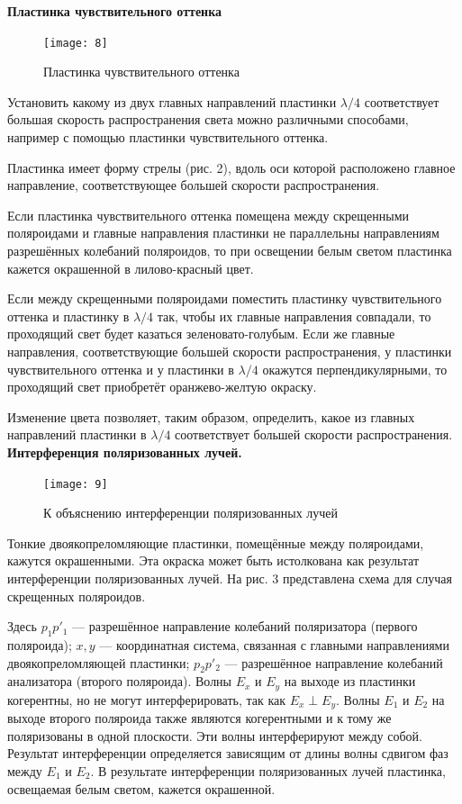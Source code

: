 \documentclass[a4paper,12pt]{report}
\begin{document}
\textbf{Пластинка чувствительного оттенка}\par
\begin{figure}
	\texttt{[image: 8]}
	\caption{Пластинка чувствительного оттенка}
	\label{ris 3}
\end{figure}

Установить какому из двух главных направлений пластинки $\lambda/4$ соответствует большая скорость распространения света можно различными способами, например с помощью пластинки чувствительного оттенка.

Пластинка имеет форму стрелы (рис. 2), вдоль оси которой расположено главное направление, соответствующее большей скорости распространения.

Если пластинка чувствительного оттенка помещена между скрещенными поляроидами и главные направления пластинки не параллельны направлениям разрешённых колебаний поляроидов, то при освещении белым светом пластинка кажется окрашенной в лилово-красный цвет.

Если между скрещенными поляроидами поместить пластинку чувствительного оттенка и пластинку в $ \lambda/4 $ так, чтобы их главные
направления совпадали, то проходящий свет будет казаться зеленовато-голубым.
Если же главные направления, соответствующие большей скорости распространения, у пластинки чувствительного оттенка и у пластинки
в $ \lambda/4 $ окажутся перпендикулярными, то проходящий свет приобретёт
оранжево-желтую окраску.

Изменение цвета позволяет, таким образом, определить, какое из
главных направлений пластинки в $ \lambda/4 $ соответствует большей скорости
распространения.
\newpage
\textbf{Интерференция поляризованных лучей.}\par
\begin{figure}
	\texttt{[image: 9]}
	\caption{К объяснению интерференции поляризованных лучей}
	\label{ris 4}
\end{figure}

Тонкие двоякопреломляющие пластинки, помещённые между поляроидами, кажутся окрашенными. Эта окраска может быть истолкована как результат интерференции поляризованных лучей. На рис. 3 представлена схема для
случая скрещенных поляроидов.

Здесь $ p_{1}p'_{1} $ --- разрешённое направление колебаний поляризатора
(первого поляроида); $ x, y $ --- координатная система, связанная с главными направлениями двоякопреломляющей пластинки; $ p_{2}p'_{2} $ --- разрешённое направление колебаний анализатора (второго поляроида). Волны
$ E_x  $ и $ E_y $ на выходе из пластинки когерентны, но не могут интерферировать, так как $ E_x \perp  E_y $. Волны $ E_1 $ и $ E_2 $ на выходе второго поляроида
также являются когерентными и к тому же поляризованы в одной плоскости. Эти волны интерферируют между собой. Результат интерференции определяется зависящим от длины волны сдвигом фаз между $ E_1 $
и $ E_2 $. В результате интерференции поляризованных лучей пластинка, освещаемая белым светом, кажется окрашенной.
\end{document}

